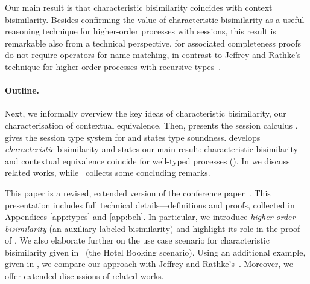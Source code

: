 Our main result is that characteristic  %
bisimilarity coincides with context bisimilarity.
Besides confirming the value of characteristic bisimilarity as a useful reasoning technique for 
higher-order processes with sessions,
this result is 
remarkable 
also from a technical perspective, for associated 
completeness proofs do not require 
operators for 
name matching,
in contrast to Jeffrey and Rathke's technique for higher-order processes
with recursive types~\cite{JeffreyR05}.




\paragraph{Outline.} 
Next,
we  informally overview the
key ideas of characteristic bisimilarity, 
our 
characterisation of contextual equivalence.
Then,   presents 
the %
session calculus \HOp. 
 gives the session type system for \HOp
and states type soundness.
{} 
develops %
\emph{characteristic} bisimilarity and 
states our main result: characteristic bisimilarity and contextual equivalence coincide for 
well-typed \HOp processes ().
In  we discuss related works, while
~collects some concluding remarks. 

This paper is a revised, extended version of the conference paper~\cite{kouzapas_et_al:LIPIcs:2015:5365}.
This presentation includes full technical details---definitions and proofs, collected in Appendices \ref{app:types} and \ref{app:beh}.
In particular, we introduce \emph{higher-order bisimilarity} (an auxiliary labeled 
bisimilarity) 
and highlight its role
in the proof of . 
We also elaborate further  on the 
use case scenario 
for characteristic bisimilarity 
given in~\cite{kouzapas_et_al:LIPIcs:2015:5365} (the Hotel Booking scenario).
Using an additional example, given in  
, we compare our approach with Jeffrey and Rathke's~\cite{JeffreyR05}. 
Moreover, we offer extended discussions of related works.

